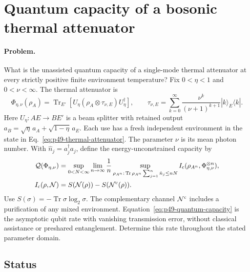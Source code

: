\section{Quantum capacity of a bosonic thermal attenuator}
\label{sec:op_9209e4eb15586dec}

\paragraph{Problem.}
What is the unassisted quantum capacity of a single-mode thermal attenuator at every strictly positive finite environment temperature?
Fix $0<\eta<1$ and $0<\nu<\infty$. The thermal attenuator is
\begin{equation}
 \Phi_{\eta,\nu}(\rho_A)=\operatorname{Tr}_{E'}[U_\eta(\rho_A\otimes\tau_{\nu,E})U_\eta^\dagger],\qquad
 \tau_{\nu,E}=\sum_{k=0}^{\infty}\frac{\nu^k}{(\nu+1)^{k+1}}|k\rangle_E\langle k|.
 \label{eq:p49-thermal-attenuator}
\end{equation}
Here $U_\eta:AE\to BE'$ is a beam splitter with retained output $a_B=\sqrt\eta\,a_A+\sqrt{1-\eta}\,a_E$. Each use has a fresh independent environment in the state in Eq.~\eqref{eq:p49-thermal-attenuator}. The parameter $\nu$ is its mean photon number.
With $\hat n_j=a_j^\dagger a_j$, define the energy-unconstrained capacity by
\begin{equation}
 \begin{aligned}
 \mathcal Q(\Phi_{\eta,\nu})&=\sup_{0<N<\infty}\lim_{n\to\infty}\frac1n
 \sup_{\rho_{A^n}:\,\operatorname{Tr}\rho_{A^n}\sum_{j=1}^n\hat n_j\leq nN}
 I_{\rm c}(\rho_{A^n},\Phi_{\eta,\nu}^{\otimes n}),\\
 I_{\rm c}(\rho,\mathcal N)&=S(\mathcal N(\rho))-S(\mathcal N^{\rm c}(\rho)).
 \end{aligned}
 \label{eq:p49-quantum-capacity}
\end{equation}
Use $S(\sigma)=-\operatorname{Tr}\sigma\log_2\sigma$. The complementary channel $\mathcal N^{\rm c}$ includes a purification of any mixed environment. Equation~\eqref{eq:p49-quantum-capacity} is the asymptotic qubit rate with vanishing transmission error, without classical assistance or preshared entanglement. Determine this rate throughout the stated parameter domain.

\subsection*{Status}

